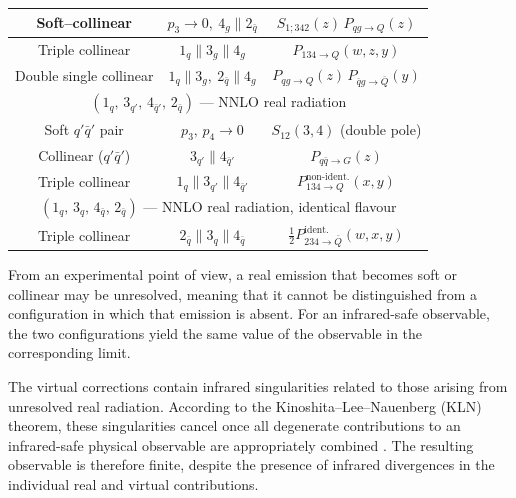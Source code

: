 {\begin{longtable}{|c|c|c|}
        \hline
        Soft--collinear         & $p_3\to0,\ 4_g\parallel2_{\bar q}$         & $S_{1;342}(z)\,P_{qg\to Q}(z)$ \\
        \hline
        Triple collinear        & $1_q\parallel3_g\parallel4_g$              & $P_{134\to Q}(w,z,y)$ \\
        \hline
        Double single collinear & $1_q\parallel3_g,\ 2_{\bar q}\parallel4_g$ & $P_{qg\to Q}(z)\,P_{\bar qg\to\bar Q}(y)$ \\
        \hline
        \multicolumn{3}{|c|}{$(1_q,\,3_{q'},\,4_{\bar q'},\,2_{\bar q})$ --- NNLO real radiation} \\
        \hline
        Soft $q'\bar q'$ pair   & $p_3,\,p_4\to0$                            & $S_{12}(3,4)$ (double pole) \\
        \hline
        Collinear ($q'\bar q'$) & $3_{q'}\parallel4_{\bar q'}$               & $P_{q\bar q\to G}(z)$ \\
        \hline
        Triple collinear        & $1_q\parallel3_{q'}\parallel4_{\bar q'}$   & $P_{134\to Q}^{\text{non-ident.}}(x,y)$ \\
        \hline
        \multicolumn{3}{|c|}{$(1_q,\,3_q,\,4_{\bar q},\,2_{\bar q})$ --- NNLO real radiation, identical flavour} \\
        \hline
        Triple collinear        & $2_{\bar q}\parallel3_q\parallel4_{\bar q}$ & $\tfrac12P_{234\to\bar Q}^{\text{ident.}}(w,x,y)$ \\
        \hline
    \end{longtable}
}

From an experimental point of view, a real emission that becomes soft or collinear
may be unresolved, meaning that it cannot be distinguished from a configuration in
which that emission is absent. For an infrared-safe observable, the two configurations
yield the same value of the observable in the corresponding limit.

The virtual corrections contain infrared singularities related to those arising from
unresolved real radiation. According to the Kinoshita--Lee--Nauenberg (KLN) theorem,
these singularities cancel once all degenerate contributions to an infrared-safe
physical observable are appropriately combined \cite{Kinoshita1962,Lee:1964is}. The
resulting observable is therefore finite, despite the presence of infrared divergences
in the individual real and virtual contributions.

